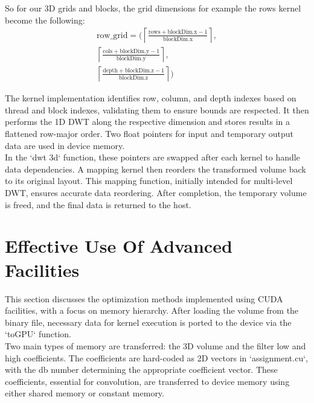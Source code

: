 \documentclass[journal,11pt]{IEEEtran}
\begin{document}
So for our 3D grids and blocks, the grid dimensions for example the rows kernel become the following:
\begin{equation}
    \begin{aligned}
        \text{row\_grid} = \Bigg( 
        \left\lceil \frac{\text{rows} + \text{blockDim.x} - 1}{\text{blockDim.x}} \right\rceil, \\
        \left\lceil \frac{\text{cols} + \text{blockDim.y} - 1}{\text{blockDim.y}} \right\rceil, \\
        \left\lceil \frac{\text{depth} + \text{blockDim.z} - 1}{\text{blockDim.z}} \right\rceil
        \Bigg)
    \end{aligned}
\end{equation}

The kernel implementation identifies row, column, and depth indexes based on thread and block indexes, validating them to ensure bounds are respected. It then performs the 1D DWT along the respective dimension and stores results in a flattened row-major order. Two float pointers for input and temporary output data are used in device memory.\\

In the `dwt 3d` function, these pointers are swapped after each kernel to handle data dependencies. A mapping kernel then reorders the transformed volume back to its original layout. This mapping function, initially intended for multi-level DWT, ensures accurate data reordering. After completion, the temporary volume is freed, and the final data is returned to the host.

\section{Effective Use Of Advanced Facilities}

This section discusses the optimization methods implemented using CUDA facilities, with a focus on memory hierarchy. After loading the volume from the binary file, necessary data for kernel execution is ported to the device via the `toGPU` function.\\

Two main types of memory are transferred: the 3D volume and the filter low and high coefficients. The coefficients are hard-coded as 2D vectors in `assignment.cu`, with the db number determining the appropriate coefficient vector. These coefficients, essential for convolution, are transferred to device memory using either shared memory or constant memory.\\
\end{document}
